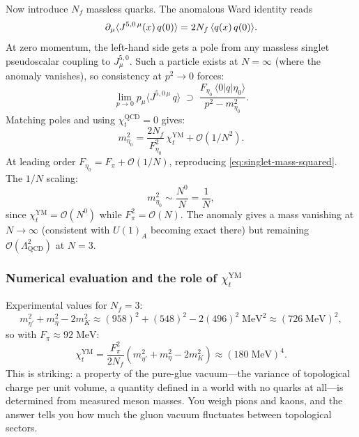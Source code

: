 Now introduce $N_f$ massless quarks.  The anomalous Ward identity reads
\begin{equation}\label{eq:ward-identity-singlet}
  \partial_\mu\langle J^{5,0\,\mu}(x)\, q(0)\rangle = 2N_f\,\langle q(x)\,q(0)\rangle.
\end{equation}
At zero momentum, the left-hand side gets a pole from any massless singlet pseudoscalar coupling to $J^{5,0}_\mu$.  Such a particle exists at $N=\infty$ (where the anomaly vanishes), so consistency at $p^2\to 0$ forces:
\begin{equation}\label{eq:pole-matching}
  \lim_{p\to 0} p_\mu\langle J^{5,0\,\mu}\, q\rangle \;\supset\; \frac{F_{\eta_0}\,\langle 0|q|\eta_0\rangle}{p^2 - m_{\eta_0}^2}.
\end{equation}
Matching poles and using $\chi_t^{\mathrm{QCD}}=0$ gives:
\begin{equation}\label{eq:mass-from-ward}
  m_{\eta_0}^2 = \frac{2N_f}{F_{\eta_0}^2}\,\chi_t^{\mathrm{YM}} + \mathcal{O}(1/N^2).
\end{equation}
At leading order $F_{\eta_0} = F_\pi + \mathcal{O}(1/N)$, reproducing \eqref{eq:singlet-mass-squared}.  The $1/N$ scaling:
\begin{equation}\label{eq:eta-mass-N-scaling}
  m_{\eta_0}^2 \sim \frac{N^0}{N} = \frac{1}{N},
\end{equation}
since $\chi_t^{\mathrm{YM}} = \mathcal{O}(N^0)$ while $F_\pi^2 = \mathcal{O}(N)$.  The anomaly gives a mass vanishing at $N\to\infty$ (consistent with $U(1)_A$ becoming exact there) but remaining $\mathcal{O}(\Lambda_{\mathrm{QCD}}^2)$ at $N=3$.

\subsubsection{Numerical evaluation and the role of $\chi_t^{\mathrm{YM}}$}

Experimental values for $N_f = 3$:
\begin{equation}\label{eq:wv-numerical}
  m_{\eta'}^2 + m_\eta^2 - 2m_K^2 \approx (958)^2 + (548)^2 - 2(496)^2 \;\mathrm{MeV}^2 \approx (726\;\mathrm{MeV})^2,
\end{equation}
so with $F_\pi \approx 92\;\mathrm{MeV}$:
\begin{equation}\label{eq:chi-t-from-spectrum}
  \chi_t^{\mathrm{YM}} = \frac{F_\pi^2}{2N_f}\left(m_{\eta'}^2 + m_\eta^2 - 2m_K^2\right) \approx (180\;\mathrm{MeV})^4.
\end{equation}
This is striking: a property of the pure-glue vacuum---the variance of topological charge per unit volume, a quantity defined in a world with no quarks at all---is determined from measured meson masses.  You weigh pions and kaons, and the answer tells you how much the gluon vacuum fluctuates between topological sectors.

